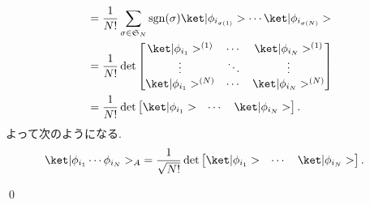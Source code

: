 \documentclass[uplatex,dvipdfmx,a4paper,11pt]{jlreq}
\makeatletter
\DeclareMathOperator{\sgn}{sgn}
\DeclareMathOperator{\Det}{det}
\renewcommand{\SS}{\mathfrak{S}}
\numberwithin{equation}{section}
\theoremstyle{definition}
\renewenvironment{proof}[1][\proofname]{\par
  \normalfont
  \topsep6\p@\@plus6\p@ \trivlist
  \item[\hskip\labelsep{\bfseries #1}\@addpunct{\bfseries}]\ignorespaces\quad\par
}{
  \qed\endtrivlist\@endpefalse
}
\renewcommand\proofname{証明}
\makeatother
\begin{document}
\begin{proof}
\begin{align}
                                                         & = \frac{1}{N!}\sum_{\sigma\in\SS_N}\sgn(\sigma)\ket|\phi_{i_{\sigma(1)}}>\cdots\ket|\phi_{i_{\sigma(N)}}>       \\
                                                         & = \frac{1}{N!}\Det\begin{bmatrix}
                                                                               \ket|\phi_{i_1}>^{(1)} & \cdots & \ket|\phi_{i_N}>^{(1)} \\
                                                                               \vdots                 & \ddots & \vdots                 \\
                                                                               \ket|\phi_{i_1}>^{(N)} & \cdots & \ket|\phi_{i_N}>^{(N)}
                                                                             \end{bmatrix}                                      \\
                                                         & = \frac{1}{N!}\Det\begin{bmatrix}
                                                                               \ket|\phi_{i_1}> & \cdots & \ket|\phi_{i_N}>
                                                                             \end{bmatrix}.
  \end{align}
  よって次のようになる.
  \begin{align}
    \ket|\phi_{i_1}\cdots\phi_{i_N}>_A & = \frac{1}{\sqrt{N!}}\Det\begin{bmatrix}\ket|\phi_{i_1}> & \cdots & \ket|\phi_{i_N}>\end{bmatrix}.
  \end{align}
\end{proof}
\end{document}
